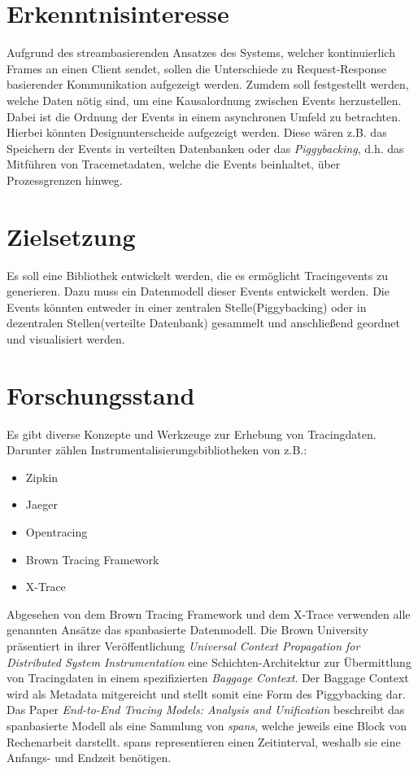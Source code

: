 \documentclass[a4paper]{article}
\begin{document}
\section{Erkenntnisinteresse}
	Aufgrund des streambasierenden Ansatzes des Systems, welcher kontinuierlich Frames an einen Client sendet, sollen die Unterschiede zu Request-Response basierender Kommunikation aufgezeigt werden. Zumdem soll festgestellt werden, welche Daten nötig sind, um eine Kausalordnung zwischen Events herzustellen. Dabei ist die Ordnung der Events in einem asynchronen Umfeld zu betrachten. Hierbei könnten Designunterscheide aufgezeigt werden. Diese wären z.B. das Speichern der Events in verteilten Datenbanken oder das \emph{Piggybacking}, d.h. das Mitführen von Tracemetadaten, welche die Events beinhaltet, über Prozessgrenzen hinweg.  
	
\section{Zielsetzung}
	Es soll eine Bibliothek entwickelt werden, die es ermöglicht Tracingevents zu generieren. Dazu muss ein Datenmodell dieser Events entwickelt werden. Die Events könnten entweder in einer zentralen  Stelle(Piggybacking) oder in dezentralen Stellen(verteilte Datenbank) gesammelt und anschließend geordnet und visualisiert werden. 
	
\section{Forschungsstand}
	Es gibt diverse Konzepte und Werkzeuge zur Erhebung von Tracingdaten. Darunter zählen Instrumentalisierungsbibliotheken von z.B.:
	\begin{itemize}
		\item Zipkin
		\item Jaeger
		\item Opentracing
		\item Brown Tracing Framework
		\item X-Trace
	\end{itemize}
	Abgesehen von dem Brown Tracing Framework und dem X-Trace verwenden alle genannten Ansätze das spanbasierte Datenmodell. Die Brown University präsentiert in ihrer Veröffentlichung \emph{Universal Context Propagation for Distributed System Instrumentation} eine Schichten-Architektur zur Übermittlung von Tracingdaten in einem spezifizierten \emph{Baggage Context}. Der Baggage Context wird als Metadata mitgereicht und stellt somit eine Form des Piggybacking dar.  Das Paper \emph{End-to-End Tracing Models: Analysis and Unification} beschreibt das spanbasierte Modell als eine Sammlung von \emph{spans}, welche jeweils eine Block von Rechenarbeit darstellt. spans representieren einen Zeitinterval, weshalb sie eine Anfangs- und Endzeit benötigen.
\end{document}
